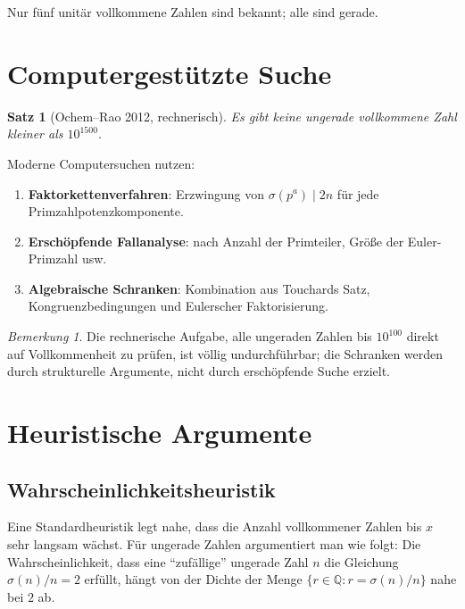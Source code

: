 \documentclass[12pt,a4paper]{amsart}
\newtheorem{satz}[theorem]{Satz}
\theoremstyle{definition}
\theoremstyle{remark}
\newtheorem{bemerkung}[theorem]{Bemerkung}
\newcommand{\Q}{\mathbb{Q}}
\begin{document}
Nur fünf unitär vollkommene Zahlen sind bekannt; alle sind gerade.

\section{Computergestützte Suche}

\begin{satz}[Ochem--Rao 2012, rechnerisch]
Es gibt keine ungerade vollkommene Zahl kleiner als $10^{1500}$.
\end{satz}

Moderne Computersuchen nutzen:
\begin{enumerate}[label=(\arabic*)]
  \item \textbf{Faktorkettenverfahren}: Erzwingung von $\sigma(p^a) \mid 2n$
        für jede Primzahlpotenzkomponente.
  \item \textbf{Erschöpfende Fallanalyse}: nach Anzahl der Primteiler,
        Größe der Euler-Primzahl usw.
  \item \textbf{Algebraische Schranken}: Kombination aus Touchards Satz,
        Kongruenzbedingungen und Eulerscher Faktorisierung.
\end{enumerate}

\begin{bemerkung}
Die rechnerische Aufgabe, alle ungeraden Zahlen bis $10^{100}$ direkt auf
Vollkommenheit zu prüfen, ist völlig undurchführbar; die Schranken werden
durch strukturelle Argumente, nicht durch erschöpfende Suche erzielt.
\end{bemerkung}

\section{Heuristische Argumente}

\subsection{Wahrscheinlichkeitsheuristik}

Eine Standardheuristik legt nahe, dass die Anzahl vollkommener Zahlen
bis $x$ sehr langsam wächst.
Für ungerade Zahlen argumentiert man wie folgt:
Die Wahrscheinlichkeit, dass eine ``zufällige'' ungerade Zahl $n$ die
Gleichung $\sigma(n)/n = 2$ erfüllt, hängt von der Dichte der Menge
$\{r \in \Q : r = \sigma(n)/n\}$ nahe bei $2$ ab.
\end{document}
